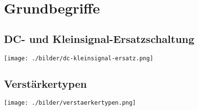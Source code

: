 \section{Grundbegriffe}
	
		\subsection{DC- und Kleinsignal-Ersatzschaltung}
			\begin{minipage}{18cm}
            \texttt{[image: ./bilder/dc-kleinsignal-ersatz.png]}
            \end{minipage}

		\subsection{Verstärkertypen}
			\begin{minipage}{10cm}
            \texttt{[image: ./bilder/verstaerkertypen.png]}
            \end{minipage}
